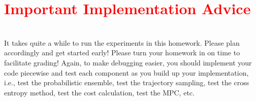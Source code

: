 \documentclass[12pt]{article}
\begin{document}
\section*{\textcolor{red}{Important Implementation Advice}}
\ \\
It takes quite a while to run the experiments in this homework.  Please plan accordingly and get started early! Please turn your homework in on time to facilitate grading!  Again, to make debugging easier, you should implement your code piecewise and test each component as you build up your implementation, i.e., test the probabilistic ensemble, test the trajectory sampling, test the cross entropy method, test the cost calculation, test the MPC, etc.


\end{document}
